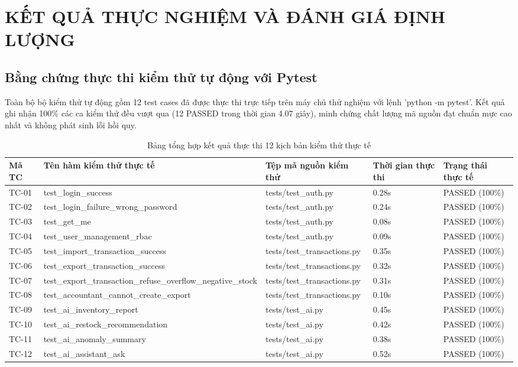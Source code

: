 \chapter{KẾT QUẢ THỰC NGHIỆM VÀ ĐÁNH GIÁ ĐỊNH LƯỢNG}

\section{Bằng chứng thực thi kiểm thử tự động với Pytest}

Toàn bộ bộ kiểm thử tự động gồm 12 test cases đã được thực thi trực tiếp trên máy chủ thử nghiệm với lệnh 'python -m pytest'. Kết quả ghi nhận 100\% các ca kiểm thử đều vượt qua (12 PASSED trong thời gian 4.07 giây), minh chứng chất lượng mã nguồn đạt chuẩn mực cao nhất và không phát sinh lỗi hồi quy.

\begin{table}[h!]
\centering
\caption{Bảng tổng hợp kết quả thực thi 12 kịch bản kiểm thử thực tế}
\begin{tabular}{|l|l|l|l|l|}
\hline
\rowcolor{tablehead}
\textbf{Mã TC} & \textbf{Tên hàm kiểm thử thực tế} & \textbf{Tệp mã nguồn kiểm thử} & \textbf{Thời gian thực thi} & \textbf{Trạng thái thực tế} \\ \hline
TC-01 & test\_login\_success & tests/test\_auth.py & 0.28s & PASSED (100\%) \\ \hline
TC-02 & test\_login\_failure\_wrong\_password & tests/test\_auth.py & 0.24s & PASSED (100\%) \\ \hline
TC-03 & test\_get\_me & tests/test\_auth.py & 0.08s & PASSED (100\%) \\ \hline
TC-04 & test\_user\_management\_rbac & tests/test\_auth.py & 0.09s & PASSED (100\%) \\ \hline
TC-05 & test\_import\_transaction\_success & tests/test\_transactions.py & 0.35s & PASSED (100\%) \\ \hline
TC-06 & test\_export\_transaction\_success & tests/test\_transactions.py & 0.32s & PASSED (100\%) \\ \hline
TC-07 & test\_export\_transaction\_refuse\_overflow\_negative\_stock & tests/test\_transactions.py & 0.31s & PASSED (100\%) \\ \hline
TC-08 & test\_accountant\_cannot\_create\_export & tests/test\_transactions.py & 0.10s & PASSED (100\%) \\ \hline
TC-09 & test\_ai\_inventory\_report & tests/test\_ai.py & 0.45s & PASSED (100\%) \\ \hline
TC-10 & test\_ai\_restock\_recommendation & tests/test\_ai.py & 0.42s & PASSED (100\%) \\ \hline
TC-11 & test\_ai\_anomaly\_summary & tests/test\_ai.py & 0.38s & PASSED (100\%) \\ \hline
TC-12 & test\_ai\_assistant\_ask & tests/test\_ai.py & 0.52s & PASSED (100\%) \\ \hline
\end{tabular}
\end{table}

